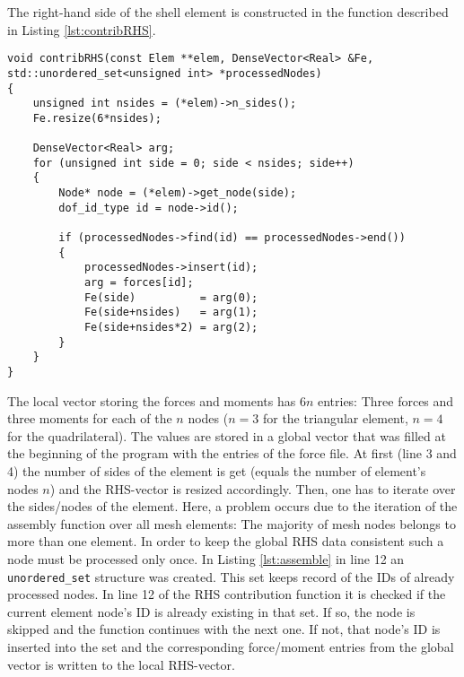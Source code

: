   The right-hand side of the shell element is constructed in the function described in Listing \ref{lst:contribRHS}.
\begin{lstlisting}[caption=Contribute RHS function,label=lst:contribRHS]
void contribRHS(const Elem **elem, DenseVector<Real> &Fe, std::unordered_set<unsigned int> *processedNodes)
{
	unsigned int nsides = (*elem)->n_sides();
	Fe.resize(6*nsides);
	
	DenseVector<Real> arg;
	for (unsigned int side = 0; side < nsides; side++)
	{
		Node* node = (*elem)->get_node(side);
		dof_id_type id = node->id();
		
		if (processedNodes->find(id) == processedNodes->end())
		{
			processedNodes->insert(id);
			arg = forces[id];			
			Fe(side)          = arg(0);
			Fe(side+nsides)   = arg(1);
			Fe(side+nsides*2) = arg(2);
		}
	}
}
\end{lstlisting}
   The local vector storing the forces and moments has $6n$ entries: Three forces and three moments for each of the $n$ nodes ($n=3$ for the triangular element, $n=4$ for the quadrilateral). The values are stored in a global vector that was filled at the beginning of the program with the entries of the force file. At first (line 3 and 4) the number of sides of the element is get (equals the number of element's nodes $n$) and the RHS-vector is resized accordingly. Then, one has to iterate over the sides/nodes of the element. Here, a problem occurs due to the iteration of the assembly function over all mesh elements: The majority of mesh nodes belongs to more than one element. In order to keep the global RHS data consistent such a node must be processed only once. In Listing \ref{lst:assemble} in line 12 an \texttt{unordered\_set} structure was created. This set keeps record of the IDs of already processed nodes. In line 12 of the RHS contribution function it is checked if the current element node's ID is already existing in that set. If so, the node is skipped and the function continues with the next one. If not, that node's ID is inserted into the set and the corresponding force/moment entries from the global vector is written to the local RHS-vector.



   
   
